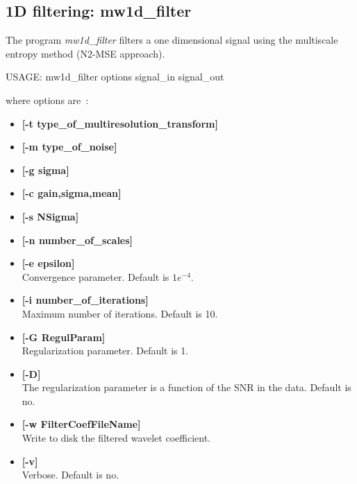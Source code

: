 \subsection{1D filtering: mw1d\_filter}
The program {\em mw1d\_filter} filters a one dimensional signal using the 
multiscale entropy method (N2-MSE approach). 
{\bf 
\begin{center}
 USAGE: mw1d\_filter options signal\_in  signal\_out
\end{center}}
where options are~:
\begin{itemize}
\baselineskip=0.4truecm
\itemsep=0.1truecm
\item {\bf [-t type\_of\_multiresolution\_transform]} 
\item {\bf [-m type\_of\_noise]}
\item {\bf [-g sigma]} 
\item {\bf [-c gain,sigma,mean]}
\item {\bf [-s NSigma]} 
\item {\bf [-n number\_of\_scales]} 
\item {\bf [-e epsilon]} \\
Convergence parameter. Default is $1e^{-4}$.
\item {\bf [-i number\_of\_iterations]} \\
Maximum number of iterations. Default is 10.
\item {\bf [-G RegulParam]} \\
Regularization parameter. Default is 1.
\item {\bf [-D]} \\
The regularization parameter is a function of the SNR in the data.
Default is no.
\item {\bf [-w FilterCoefFileName]} \\
Write to  disk the filtered wavelet coefficient.
\item {\bf [-v]} \\
Verbose. Default is no.
\end{itemize}

